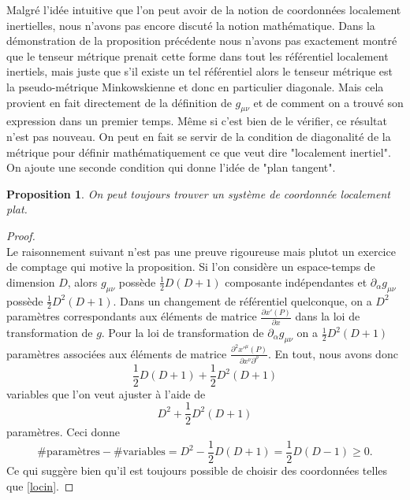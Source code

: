 \documentclass[a4paper,11pt]{report}
\theoremstyle{definition}
\theoremstyle{plain}
\newtheorem{prop}[thm]{Proposition}
\theoremstyle{definition}
\theoremstyle{remark}
\newcommand{\p}{\partial}
\begin{document}
            Malgré l'idée intuitive que l'on peut avoir de la notion de coordonnées localement inertielles, nous n'avons pas encore discuté la notion mathématique. Dans la démonstration de la proposition précédente nous n'avons pas exactement montré que le tenseur métrique prenait cette forme dans tout les référentiel localement inertiels, mais juste que s'il existe un tel référentiel alors le tenseur métrique est la pseudo-métrique Minkowskienne et donc en particulier diagonale. Mais cela provient en fait directement de la définition de $g_{\mu\nu}$ et de comment on a trouvé son expression dans un premier temps. Même si c'est bien de le vérifier, ce résultat n'est pas nouveau. On peut en fait se servir de la condition de diagonalité de la métrique pour définir mathématiquement ce que veut dire "localement inertiel". On ajoute une seconde condition qui donne l'idée de "plan tangent".
            
            \begin{prop}
                On peut toujours trouver un système de coordonnée localement plat.
            \end{prop}
            
            \begin{proof}
            ${}$\\
                Le raisonnement suivant n'est pas une preuve rigoureuse mais plutot un exercice de comptage qui motive la proposition. Si l'on considère un espace-temps de dimension $D$, alors $g_{\mu\nu}$ possède $\frac{1}{2}D(D+1)$ composante indépendantes et $\p_\alpha g_{\mu\nu}$ possède $\frac{1}{2}D^2(D+1)$. Dans un changement de référentiel quelconque, on a $D^2$ paramètres correspondants aux éléments de matrice $\frac{\p x'(P)}{\p x}$ dans la loi de transformation de $g$. Pour la loi de transformation de $\p_\alpha g_{\mu\nu}$ on a $\frac{1}{2}D^2(D+1)$ paramètres associées aux éléments de matrice $\frac{\p^2 x'^\mu(P)}{\p x^\nu\p^\rho}$. En tout, nous avons donc
                \begin{equation}
                    \frac{1}{2}D(D+1)+\frac{1}{2}D^2(D+1)
                \end{equation}
                variables que l'on veut ajuster à l'aide de
                \begin{equation}
                    D^2+\frac{1}{2}D^2(D+1)
                \end{equation}
                paramètres. Ceci donne
                \begin{equation}
                    \#\text{paramètres}-\#\text{variables} = D^2-\frac{1}{2}D(D+1) = \frac{1}{2}D(D-1)\geq0.
                \end{equation}
                Ce qui suggère bien qu'il est toujours possible de choisir des coordonnées telles que \ref{locin}.
            \end{proof}
            
\end{document}
